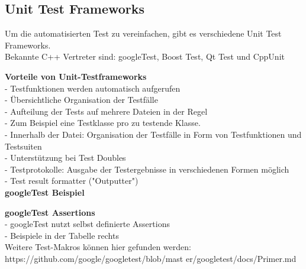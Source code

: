 \subsection{Unit Test Frameworks}
Um die automatisierten Test zu vereinfachen, gibt es verschiedene Unit Test Frameworks. \\
Bekannte C++ Vertreter sind: googleTest, Boost Test, Qt Test und CppUnit

\textbf{Vorteile von Unit-Testframeworks} \\
- Testfunktionen werden automatisch aufgerufen \\
- Übersichtliche Organisation der Testfälle \\
- Aufteilung der Tests auf mehrere Dateien in der Regel \\
- Zum Beispiel eine Testklasse pro zu testende Klasse. \\
- Innerhalb der Datei: Organisation der Testfälle in Form von Testfunktionen und Testsuiten \\
- Unterstützung bei Test Doubles \\
- Testprotokolle: Ausgabe der Testergebnisse in verschiedenen Formen möglich \\
- Test result formatter ("Outputter") \\

\textbf{googleTest Beispiel} \\

\textbf{googleTest Assertions} \\
- googleTest nutzt selbst definierte Assertions \\
- Beispiele in der Tabelle rechts \\
Weitere Test-Makros können hier gefunden 
werden:
https://github.com/google/googletest/blob/mast
er/googletest/docs/Primer.md

